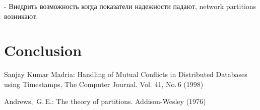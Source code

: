 \documentclass{llncs}
\begin{document}
- Внедрить возможность когда показатели надежности падают, network partitions возникают.


\section{Conclusion}

\begin{thebibliography}{00}

Sanjay Kumar Madria: 
Handling of Mutual Conflicts in Distributed Databases using Timestamps,
The Computer Journal. Vol. 41, No.\,6 (1998) 

Andrews,~G.\,E.:
The theory of partitions.
Addison-Wesley (1976)
\end{thebibliography} 
\end{document}
